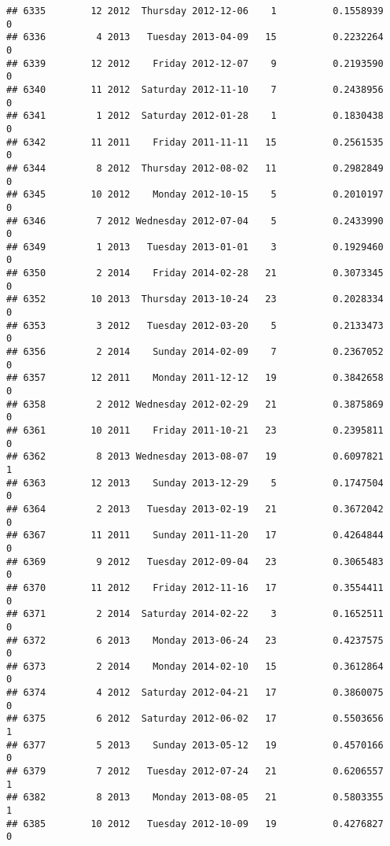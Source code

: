 \documentclass[
]{article}
\begin{document}
\begin{verbatim}
## 6335        12 2012  Thursday 2012-12-06    1          0.1558939             0
## 6336         4 2013   Tuesday 2013-04-09   15          0.2232264             0
## 6339        12 2012    Friday 2012-12-07    9          0.2193590             0
## 6340        11 2012  Saturday 2012-11-10    7          0.2438956             0
## 6341         1 2012  Saturday 2012-01-28    1          0.1830438             0
## 6342        11 2011    Friday 2011-11-11   15          0.2561535             0
## 6344         8 2012  Thursday 2012-08-02   11          0.2982849             0
## 6345        10 2012    Monday 2012-10-15    5          0.2010197             0
## 6346         7 2012 Wednesday 2012-07-04    5          0.2433990             0
## 6349         1 2013   Tuesday 2013-01-01    3          0.1929460             0
## 6350         2 2014    Friday 2014-02-28   21          0.3073345             0
## 6352        10 2013  Thursday 2013-10-24   23          0.2028334             0
## 6353         3 2012   Tuesday 2012-03-20    5          0.2133473             0
## 6356         2 2014    Sunday 2014-02-09    7          0.2367052             0
## 6357        12 2011    Monday 2011-12-12   19          0.3842658             0
## 6358         2 2012 Wednesday 2012-02-29   21          0.3875869             0
## 6361        10 2011    Friday 2011-10-21   23          0.2395811             0
## 6362         8 2013 Wednesday 2013-08-07   19          0.6097821             1
## 6363        12 2013    Sunday 2013-12-29    5          0.1747504             0
## 6364         2 2013   Tuesday 2013-02-19   21          0.3672042             0
## 6367        11 2011    Sunday 2011-11-20   17          0.4264844             0
## 6369         9 2012   Tuesday 2012-09-04   23          0.3065483             0
## 6370        11 2012    Friday 2012-11-16   17          0.3554411             0
## 6371         2 2014  Saturday 2014-02-22    3          0.1652511             0
## 6372         6 2013    Monday 2013-06-24   23          0.4237575             0
## 6373         2 2014    Monday 2014-02-10   15          0.3612864             0
## 6374         4 2012  Saturday 2012-04-21   17          0.3860075             0
## 6375         6 2012  Saturday 2012-06-02   17          0.5503656             1
## 6377         5 2013    Sunday 2013-05-12   19          0.4570166             0
## 6379         7 2012   Tuesday 2012-07-24   21          0.6206557             1
## 6382         8 2013    Monday 2013-08-05   21          0.5803355             1
## 6385        10 2012   Tuesday 2012-10-09   19          0.4276827             0

\end{verbatim}
\end{document}
